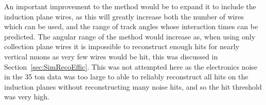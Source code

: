An important improvement to the method would be to expand it to include the induction plane wires, as this will greatly increase both the number of wires which can be used, and the range of track angles whose interaction times can be predicted. The angular range of the method would increase as, when using only collection plane wires it is impossible to reconstruct enough hits for nearly vertical muons as very few wires would be hit, this was discussed in Section~\ref{sec:SimRecoEffic}. This was not attempted here as the electronics noise in the 35 ton data was too large to able to reliably reconstruct all hits on the induction planes without reconstructing many noise hits, and so the hit threshold was very high. \\
